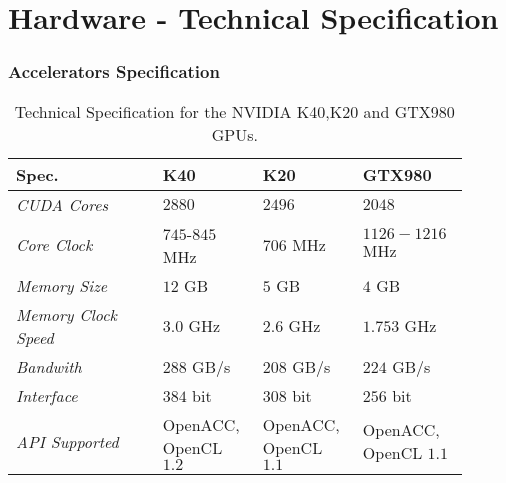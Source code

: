 \chapter{Hardware - Technical Specification}
\label{app:tech_spec}
\subsection{Accelerators Specification}
\begin{table}[H]
	\centering
	\caption{Technical Specification for the NVIDIA K40,K20 and GTX980 GPUs.}
	\label{tab:tech_spec_nvidia}
\begin{tabular}{m{0.3\linewidth} m{0.2\linewidth} m{0.2\linewidth} m{0.2\linewidth}}
	\toprule
	{\textbf{Spec.}} & {\textbf{K40}} & {\textbf{K20}} & {\textbf{GTX980}}\\
	\midrule
	\textit{CUDA Cores}                & $2880$   & $2496$    & $2048$   \\
	
	\textit{Core Clock}                & $745$-$845$ \si{MHz}   & $706$ \si{MHz}    &    $1126-1216$ \si{MHz} \\

	
\midrule
	
	\textit{Memory Size}                & $12$ \si{GB}  & $5$ \si{GB}    & $4$ \si{GB}    \\
	
	\textit{Memory Clock Speed}                & $3.0$ \si{GHz}   & $2.6$ \si{GHz}    &  $1.753$ \si{GHz}    \\
	
	\textit{Bandwith}                & $288$ \si{GB/s}   & $208$ \si{GB/s}   & $224$ \si{GB/s}   \\

	\textit{Interface}                & $384$ bit   & $308$ \si{bit}    & $256$ \si{bit}    \\

	\midrule
	\textit{API Supported}                & OpenACC, OpenCL $1.2$   &  OpenACC, OpenCL $1.1$    & OpenACC, OpenCL $1.1$    \\
	\bottomrule
\end{tabular}
\end{table}

